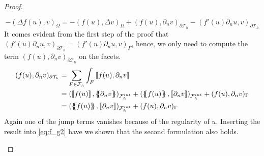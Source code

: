 \begin{proof}
\begin{enumerate}[label=\arabic*)]
\begin{equation}
\label{eq:f_g2}
-(\Delta f( u) , v)_{\Omega  }  = -( f( u), \Delta v )_{\Omega } + (f( u), \partial _{n} v  )_{\partial \mathcal{T}_{h} } - (   f'( u)\partial _{n}u, v )_{\partial \mathcal{T}_{h}  }
\end{equation}
It comes evident from the first step of the proof that $ (   f'( u)\partial _{n}u, v )_{\partial \mathcal{T}_{h}  } = (   f'( u)\partial _{n}u, v )_{\Gamma }$, hence, we only need to compute the term $(f( u), \partial _{n} v  )_{\partial
\mathcal{T}_{h} }$ on the facets. \[
    \begin{split}
(f( u), \partial _{n} v  )_{\partial
\mathcal{T}_{h} } & = \sum_{F\in \mathcal{F} _{h}}^{} \int_{F}^{}\jump{ f( u), \partial _{n} v  } \\
& =  (\jump{ f( u)  }  , \mean{ \partial _{n} v }    )_{ \mathcal{F}_{h}^{int} } +(\mean{ f( u)  }  , \jump{ \partial _{n} v }    )_{ \mathcal{F}_{h}^{int} } + (f( u), \partial _{n} v  )_{\Gamma } \\
&=  (\mean{ f( u)  }  , \jump{ \partial _{n} v }    )_{ \mathcal{F}_{h}^{int} } + (f( u), \partial _{n} v  )_{\Gamma }
    \end{split}
\]
Again one of the jump terms vanishes because of the regularity of $u$.
Inserting the result into \eqref{eq:f_g2} have we shown that the second formulation also holds.
    \end{enumerate}
\end{proof}

